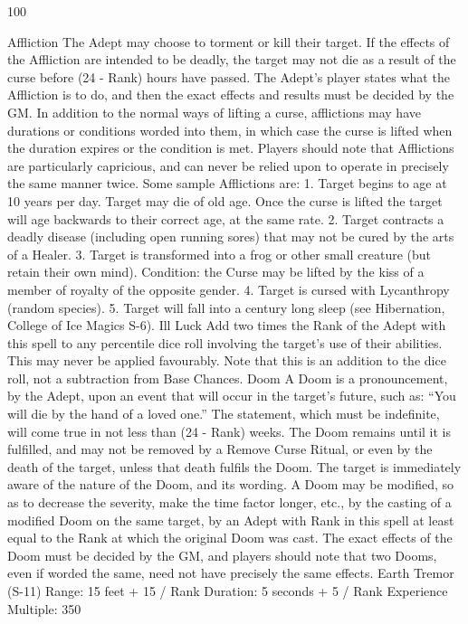 \documentclass[a4paper]{article}
\begin{document}
\begin{multicols}{3}
100

Affliction The Adept may choose to torment or kill
their target. If the effects of the Affliction are intended to be deadly, the target may not die as a
result of the curse before (24 - Rank) hours have
passed. The Adept’s player states what the Affliction is to do, and then the exact effects and results
must be decided by the GM. In addition to the
normal ways of lifting a curse, afflictions may have
durations or conditions worded into them, in which
case the curse is lifted when the duration expires or
the condition is met. Players should note that Afflictions are particularly capricious, and can never
be relied upon to operate in precisely the same
manner twice. Some sample Afflictions are:
1. Target begins to age at 10 years per day. Target
may die of old age. Once the curse is lifted the
target will age backwards to their correct age, at
the same rate.
2. Target contracts a deadly disease (including
open running sores) that may not be cured by the
arts of a Healer.
3. Target is transformed into a frog or other small
creature (but retain their own mind). Condition: the
Curse may be lifted by the kiss of a member of
royalty of the opposite gender.
4. Target is cursed with Lycanthropy (random
species).
5. Target will fall into a century long sleep (see
Hibernation, College of Ice Magics S-6).
Ill Luck Add two times the Rank of the Adept with
this spell to any percentile dice roll involving the
target’s use of their abilities. This may never be
applied favourably. Note that this is an addition to
the dice roll, not a subtraction from Base Chances.
Doom A Doom is a pronouncement, by the Adept,
upon an event that will occur in the target’s future,
such as: “You will die by the hand of a loved one.”
The statement, which must be indefinite, will come
true in not less than (24 - Rank) weeks. The Doom
remains until it is fulfilled, and may not be removed by a Remove Curse Ritual, or even by the
death of the target, unless that death fulfils the
Doom. The target is immediately aware of the
nature of the Doom, and its wording. A Doom may
be modified, so as to decrease the severity, make
the time factor longer, etc., by the casting of a
modified Doom on the same target, by an Adept
with Rank in this spell at least equal to the Rank at
which the original Doom was cast. The exact effects of the Doom must be decided by the GM, and
players should note that two Dooms, even if
worded the same, need not have precisely the same
effects.
Earth Tremor (S-11)
Range: 15 feet + 15 / Rank
Duration: 5 seconds + 5 / Rank
Experience Multiple: 350

\end{multicols}
\end{document}
